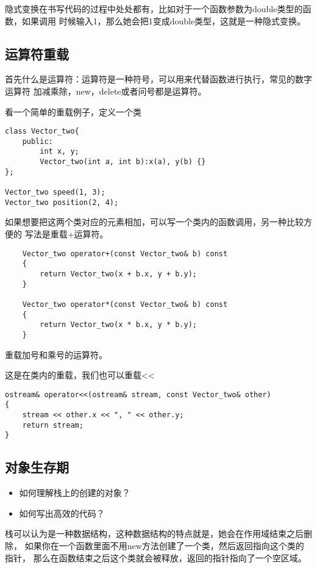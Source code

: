 \documentclass{article}
\begin{document}
\begin{sloppypar}
隐式变换在书写代码的过程中处处都有，比如对于一个函数参数为double类型的函数，如果调用
时候输入1，那么她会把1变成double类型，这就是一种隐式变换。

\subsection{运算符重载}
\begin{outline}
	\1 首先什么是运算符：运算符是一种符号，可以用来代替函数进行执行，常见的数字运算符
	加减乘除，new，delete或者问号都是运算符。
\end{outline}

看一个简单的重载例子，定义一个类
\begin{lstlisting}
class Vector_two{
    public:
        int x, y;
        Vector_two(int a, int b):x(a), y(b) {}
};

Vector_two speed(1, 3);
Vector_two position(2, 4);

\end{lstlisting}

如果想要把这两个类对应的元素相加，可以写一个类内的函数调用，另一种比较方便的
写法是重载+运算符。
\begin{lstlisting}
	Vector_two operator+(const Vector_two& b) const
    {
        return Vector_two(x + b.x, y + b.y);
    }

    Vector_two operator*(const Vector_two& b) const
    {
        return Vector_two(x * b.x, y * b.y);
    }
\end{lstlisting}
重载加号和乘号的运算符。

这是在类内的重载，我们也可以重载<<
\begin{lstlisting}
ostream& operator<<(ostream& stream, const Vector_two& other)
{
    stream << other.x << ", " << other.y;
    return stream;
}
\end{lstlisting}

\subsection{对象生存期}
\begin{itemize}
	\item 如何理解栈上的创建的对象？
	\item 如何写出高效的代码？
\end{itemize}
栈可以认为是一种数据结构，这种数据结构的特点就是，她会在作用域结束之后删除，
如果你在一个函数里面不用new方法创建了一个类，然后返回指向这个类的指针，
那么在函数结束之后这个类就会被释放，返回的指针指向了一个空区域。


\end{sloppypar}
\end{document}
